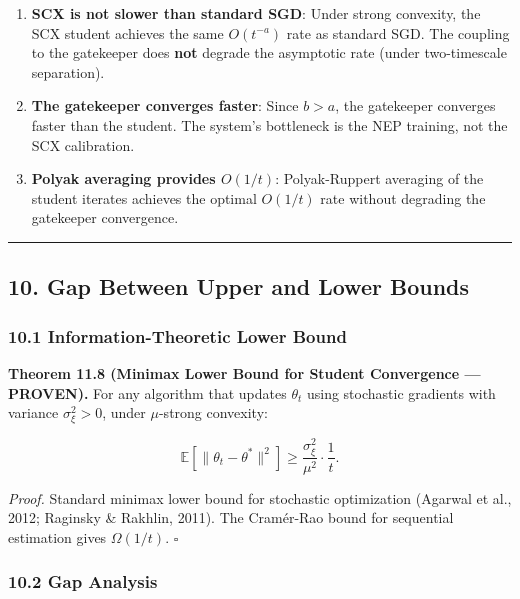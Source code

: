 \documentclass[
  12pt,
]{ctexart}
\begin{document}
\begin{enumerate}
\def\labelenumi{\arabic{enumi}.}
\item
  \textbf{SCX is not slower than standard SGD}: Under strong convexity,
  the SCX student achieves the same \(O(t^{-a})\) rate as standard SGD.
  The coupling to the gatekeeper does \textbf{not} degrade the
  asymptotic rate (under two-timescale separation).
\item
  \textbf{The gatekeeper converges faster}: Since \(b > a\), the
  gatekeeper converges faster than the student. The system's bottleneck
  is the NEP training, not the SCX calibration.
\item
  \textbf{Polyak averaging provides \(O(1/t)\)}: Polyak-Ruppert
  averaging of the student iterates achieves the optimal \(O(1/t)\) rate
  without degrading the gatekeeper convergence.
\end{enumerate}

\begin{center}\rule{0.5\linewidth}{0.5pt}\end{center}

\subsection{10. Gap Between Upper and Lower
Bounds}\label{gap-between-upper-and-lower-bounds}

\subsubsection{10.1 Information-Theoretic Lower
Bound}\label{information-theoretic-lower-bound}

\textbf{Theorem 11.8 (Minimax Lower Bound for Student Convergence ---
PROVEN).} For any algorithm that updates \(\theta_t\) using stochastic
gradients with variance \(\sigma_\xi^2 > 0\), under \(\mu\)-strong
convexity:

\[\mathbb{E}[\|\theta_t - \theta^*\|^2] \geq \frac{\sigma_\xi^2}{\mu^2} \cdot \frac{1}{t}.\]

\emph{Proof.} Standard minimax lower bound for stochastic optimization
(Agarwal et al., 2012; Raginsky \& Rakhlin, 2011). The Cramér-Rao bound
for sequential estimation gives \(\Omega(1/t)\). \(\square\)

\subsubsection{10.2 Gap Analysis}\label{gap-analysis}
\end{document}
